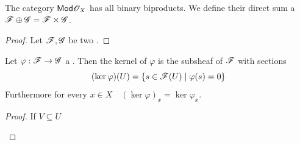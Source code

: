 \documentclass[../main.tex]{subfiles}
\begin{document}
\begin{lemma}
  The category \(\mathsf{Mod}{\mathscr{O}_{X}}\) has all binary biproducts.
  We define their direct sum a \(\mathscr{F} \oplus \mathscr{G} = \mathscr{F} \times \mathscr{G}\).
\end{lemma}
\begin{proof}
  Let \(\mathscr{F}, \mathscr{G}\) be two .
\end{proof}



\begin{theorem}
  Let \(\varphi: \mathscr{F} \to \mathscr{G}\) a .
  Then the kernel of \(\varphi\) is the subsheaf of \(\mathscr{F}\) with sections
  \begin{equation*}
    (\ker \varphi)(U) = \{ s \in \mathscr{F}(U) \mid \varphi(s) = 0 \}
  \end{equation*}
  Furthermore for every \(x \in X \quad (\ker \varphi)_{x} = \ker \varphi_{x}\).
\end{theorem}
\begin{proof}
  If \(V \subseteq U\)
  \begin{center}
  \end{center}
 \end{proof}
\end{document}
